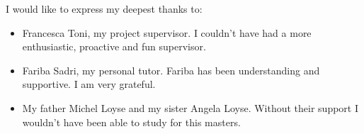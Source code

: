 
\cleardoublepage  %


\begin{acknowledgements}

I would like to express my deepest thanks to:

\begin{itemize}
 \item Francesca Toni, my project supervisor. I couldn't have had a more enthusiastic, proactive and fun supervisor.
 \vspace*{3mm}
 \item Fariba Sadri, my personal tutor. Fariba has been understanding and supportive. I am very grateful. 
 \vspace*{3mm}
 \item My father Michel Loyse and my sister Angela Loyse. Without their support I wouldn't have been able to study for this masters.
\end{itemize}

\end{acknowledgements}
